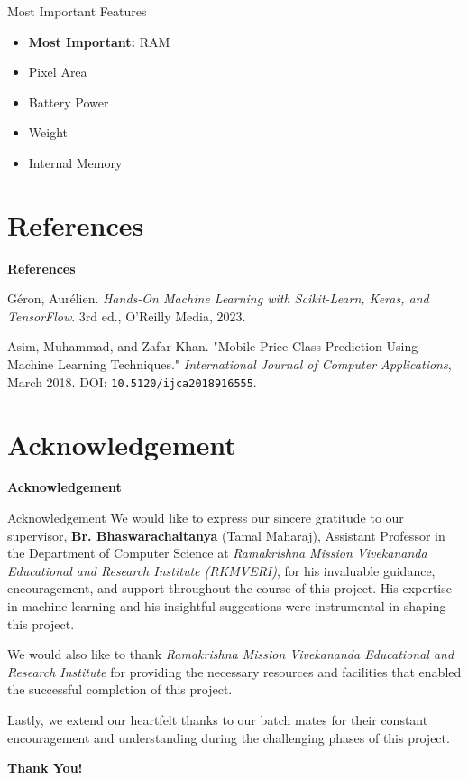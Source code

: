 \documentclass[14pt, aspectratio=169]{beamer}
\begin{document}
\begin{frame}{Most Important Features}
  \begin{itemize}
    \setlength\itemsep{1em}
    \item<1->\textbf{Most Important:} RAM
    \item<2-> Pixel Area
    \item<3-> Battery Power
    \item<4-> Weight
    \item<5-> Internal Memory
  \end{itemize}
\end{frame}

\section{References}
\begin{frame}{}
  \Huge
  \centering
  \textbf{References}
  \normalsize
\end{frame}
\begin{frame}{}
  \footnotesize
  \begin{thebibliography}{9}
    Géron, Aurélien. \textit{Hands-On Machine Learning with Scikit-Learn, Keras, and TensorFlow}. 3rd ed., O'Reilly Media, 2023.
  
    Asim, Muhammad, and Zafar Khan. "Mobile Price Class Prediction Using Machine Learning Techniques." \textit{International Journal of Computer Applications}, March 2018. DOI: \texttt{10.5120/ijca2018916555}.
  
  \end{thebibliography}
\end{frame}

\section{Acknowledgement}
\begin{frame}{}
  \Huge
  \centering
  \textbf{Acknowledgement}
  \normalsize
\end{frame}
\begin{frame}{Acknowledgement}
  \footnotesize
  We would like to express our sincere gratitude to our supervisor, \textbf{Br. Bhaswarachaitanya} (Tamal Maharaj), Assistant Professor in the Department of Computer Science at \textit{Ramakrishna Mission Vivekananda Educational and Research Institute (RKMVERI)}, for his invaluable guidance, encouragement, and support throughout the course of this project. His expertise in machine learning and his insightful suggestions were instrumental in shaping this project.

  We would also like to thank \textit{Ramakrishna Mission Vivekananda Educational and Research Institute} for providing the necessary resources and facilities that enabled the successful completion of this project.

  Lastly, we extend our heartfelt thanks to our batch mates for their constant encouragement and understanding during the challenging phases of this project.
\end{frame}

\begin{frame}{}
  \Huge
  \centering
  \textbf{Thank You!}
\end{frame}
\end{document}
